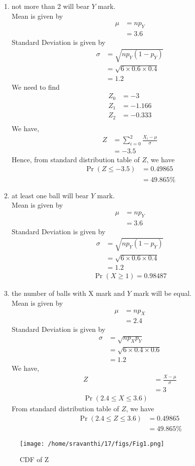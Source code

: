 \documentclass[journal,12pt,onecolumn]{IEEEtran}
\theoremstyle{remark}
\begin{document}
\begin{enumerate}
\item not more than 2 will bear $Y$ mark.\\
Mean is given by
\begin{align}
	\mu &= np_Y \\
	&= 3.6
\end{align}
Standard Deviation is given by
\begin{align}
	\sigma &= \sqrt{np_Y(1 - p_Y)}\\
	&= \sqrt{6 \times 0.6 \times 0.4}\\
	&=  1.2
\end{align}
We need to find
\begin{align}
       Z_0&=-3 \\
       Z_1&=-1.166 \\
       Z_2&=-0.333\\ 
\end{align}
We have,
\begin{align}
	Z &= \sum_{i=0}^{2}\frac{X_i - \mu}{\sigma} \\
	&= -3.5
\end{align}
Hence, from standard distribution table of $Z$, we have
\begin{align}
	\Pr(Z \le -3.5) &= 0.49865\\
	&= 49.865\%
\end{align}
\item at least one ball will bear $Y$ mark.\\
Mean is given by
\begin{align}
	\mu &= np_Y \\
	&= 3.6
\end{align}
Standard Deviation is given by
\begin{align}
	\sigma &= \sqrt{np_Y(1 - p_Y)}\\
	&= \sqrt{6 \times 0.6 \times 0.4}\\
	&=  1.2
\end{align}
\begin{align}
	\Pr(X \geq 1) = 0.98487
\end{align}
\item the number of balls with X mark and $Y$ mark will be equal.\\
Mean is given by
\begin{align}
	\mu &= np_X \\
	&= 2.4
\end{align}
Standard Deviation is given by
\begin{align}
	\sigma &= \sqrt{np_X p_Y}\\
	&= \sqrt{6 \times 0.4 \times 0.6}\\
	&=  1.2
\end{align}
We have,
\begin{align}
Z &= \frac{X - \mu}{\sigma} \\
	&= 3\\
        \Pr(2.4 \leq X\leq 3.6)	
\end{align}
From standard distribution table of $Z$, we have
\begin{align}
	\Pr(2.4 \leq Z\leq 3.6) &= 0.49865\\
	&= 49.865 \%
\end{align}
\end{enumerate}

\begin{figure}
\texttt{[image: /home/sravanthi/17/figs/Fig1.png]}
\caption{CDF of Z}
\label{fig:gaussian/9/3/17/}
\end{figure}
\end{document}
